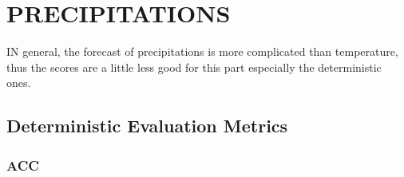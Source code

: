 %
%
%
%




\section{PRECIPITATIONS}
IN general, the forecast of precipitations is more complicated than temperature, thus the scores are a little less good for this part especially the deterministic ones. 
\subsection{Deterministic Evaluation Metrics}

\subsubsection{ACC}

